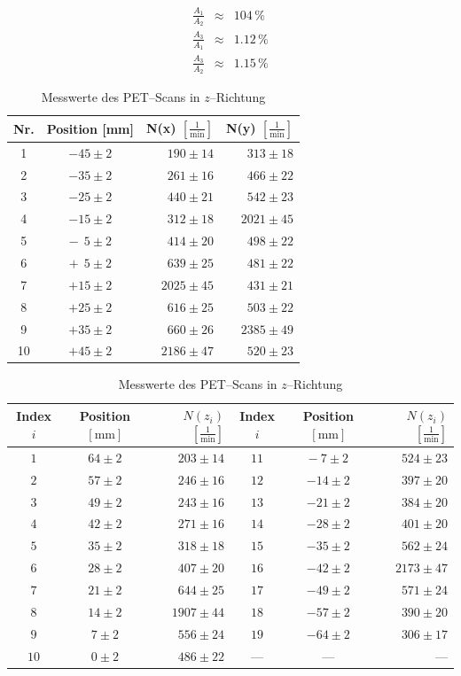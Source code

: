 \documentclass[12pt,a4paper]{scrartcl}
\numberwithin{equation}{section} %
\begin{document}
\begin{eqnarray}
	\frac{A_1}{A_2} &\approx& 104\,\% \\
	\frac{A_3}{A_1} &\approx& 1.12\,\% \\
	\frac{A_3}{A_2} &\approx& 1.15\,\%
\end{eqnarray}

\begin{table}
	\centering
	\begin{tabular}[h]{c|c|r|r}
		Nr. & Position [mm] & N(x) $[\frac{1}{\mathrm{min}}]$ & N(y) $[\frac{1}{\mathrm{min}}]$ \vspace{1pt}\\
		\hline
		1 & $-45 \pm 2$ & $190 \pm 14$ & $313 \pm 18$ \\
		2 & $-35 \pm 2$ & $261 \pm 16$ & $466 \pm 22$ \\
		3 & $-25 \pm 2$ & $440 \pm 21$ & $542 \pm 23$ \\
		4 & $-15 \pm 2$ & $312 \pm 18$ & $2021 \pm 45$ \\
		5 & $-\ \ 5 \pm 2$ & $414 \pm 20$ & $498 \pm 22$ \\
		6 & $+\ \ 5 \pm 2$ & $639 \pm 25$ & $481 \pm 22$ \\
		7 & $+15 \pm 2$ & $2025 \pm 45$ & $431 \pm 21$ \\
		8 & $+25 \pm 2$ & $616 \pm 25$ & $503 \pm 22$ \\
		9 & $+35 \pm 2$ & $660 \pm 26$ & $2385 \pm 49$ \\
		10 & $+45 \pm 2$ & $2186 \pm 47$ & $520 \pm 23$
	\end{tabular}
	\caption{Messwerte des PET--Scans in $x$-- und $y$--Richtung}
	\label{tab:PET x y}
	
	\vspace{24pt}
	\begin{tabular}{c|c|r||c|c|r}
		Index $i$ &
			Position $[\mathrm{mm}]$ &
			$N(z_i)$ $[\frac{1}{\mathrm{min}}]$&
			Index $i$ &
			Position $[\mathrm{mm}]$ &
			$N(z_i)$ $[\frac{1}{\mathrm{min}}]$ \vspace{1pt}\\
		\hline
		$1$ & $64 \pm 2$ & $203 \pm 14$&
		$11$ & $-\ 7 \pm 2$ & $524 \pm 23$ \\
		$2$ & $57 \pm 2$ & $246\pm 16$&
		$12$ & $-14 \pm 2$ & $397 \pm 20$ \\
		$3$ & $49 \pm 2$ & $243\pm 16$ &
		$13$ & $-21 \pm 2$ & $384 \pm 20$ \\
		$4$ & $42 \pm 2$ & $271 \pm 16$ &
		$14$ & $-28 \pm 2$ & $401 \pm 20$ \\
		$5$ & $35 \pm 2$ & $318 \pm 18$ &
		$15$ & $-35 \pm 2$ & $562 \pm 24$ \\
		$6$ & $28 \pm 2$ & $407 \pm 20$ &
		$16$ & $-42 \pm 2$ & $2173 \pm 47$ \\
		$7$ & $21 \pm 2$ & $644 \pm 25$ &
		$17$ & $-49 \pm 2$ & $571 \pm 24$ \\
		$8$ & $14 \pm 2$ & $1907 \pm 44$ &
		$18$ & $-57 \pm 2$ & $390 \pm 20$ \\
		$9$ & $7 \pm 2$ & $556 \pm 24$ &
		$19$ & $-64 \pm 2$ & $306 \pm 17$ \\
		$10$ & $0 \pm 2$ & $486 \pm 22$ &---&---&---
	\end{tabular}
	\caption{Messwerte des PET--Scans in $z$--Richtung}
	\label{tab:PET z}


\end{table}
\end{document}
